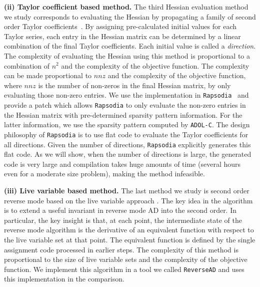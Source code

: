 \documentclass[11pt, twocolumn]{article}
\begin{document}
{\bf (ii) Taylor coefficient based method. } 
The third Hessian evaluation method  we study  corresponds to evaluating the Hessian by propagating a family of second order Taylor coefficients~\cite{griewank2000evaluating}. 
By assigning pre-calculated initial values for each Taylor series, each entry in the Hessian matrix  can be determined by a linear combination of the final Taylor coefficients. Each initial value is called a {\em direction}.
The complexity of evaluating the Hessian using this method is proportional to a combination of $n^2$ and the complexity of the objective function. The complexity can be made proportional to $nnz$ and the complexity of the objective function, where $nnz$ is the number of non-zeros in the final Hessian matrix, by only evaluating those non-zero entries.
We use the implementation in {\tt Rapsodia}~\cite{charpentier2009fast} and provide a patch which allows {\tt Rapsodia} to only evaluate the non-zero entries in the Hessian matrix with pre-determined sparsity pattern information. For the latter information, we use the sparsity pattern computed by {\tt ADOL-C}. The design philosophy of {\tt Rapsodia} is to use flat code to evaluate the Taylor coefficients for all directions. Given the number of directions, {\tt Rapsodia} explicitly generates this flat code. As we will show, when the number of directions is large, the generated code is very large and compilation takes huge amounts of time (several hours even for a moderate size problem), making the method infeasible. 

{\bf (iii) Live variable based method. }
The last method we study is second order reverse mode based on the live variable approach \cite{wang2016capitalizing}. The key idea in the algorithm is to extend a useful invariant in reverse mode AD into the second order. In particular, the key insight is that, at each point, the intermediate state of the reverse mode algorithm is the derivative of an equivalent function with respect to the live variable set at that point. The equivalent function is defined by the single assignment code processed in earlier steps. The complexity of this method is proportional to the size of live variable sets and the complexity of the objective function. We implement this algorithm in a tool we called {\tt ReverseAD} and uses this implementation in the comparison.
\end{document}
